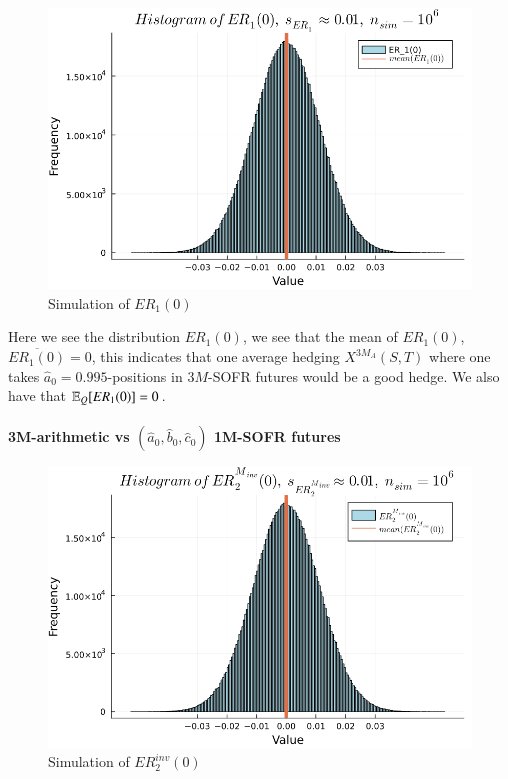 \begin{figure}[htp]
    \centering
    \includegraphics[width=12cm]{figures/SOFR/ER_1(0).PNG}
    \caption{Simulation of $ER_{1}(0)$}
    \label{fig: ER_1_(0)}
\end{figure}

Here we see the distribution $ER_{1}(0)$, we see that the mean of $ER_{1}(0)$, $\overline{ER_{1}(0)} = 0$, this indicates that one average hedging $X^{3M_{A}}(S,T)$ where one takes $\hat{a}_{0} = 0.995$-positions in $3M$-SOFR futures would be a good hedge. We also have that $\mathbb{E}_{Q}[ER_{1}(0)] = 0$.  
\\~\\
\textbf{3M-arithmetic vs $(\hat{a}_{0}, \hat{b}_{0}, \hat{c}_{0})$ 1M-SOFR futures}

\begin{figure}[htp]
    \centering
    \includegraphics[width=12cm]{figures/SOFR/ER_2(0)_M_inv.PNG}
    \caption{Simulation of $ER_{2}^{inv}(0)$}
    \label{fig: ER_2_(0)_M_inv}
\end{figure}

